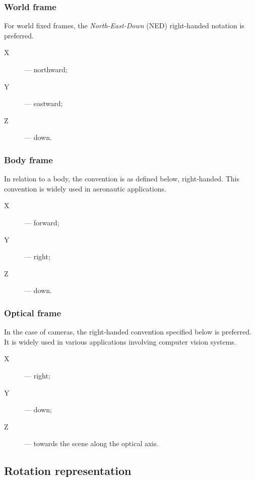\subsubsection{World frame}

For world fixed frames, the \emph{North-East-Down} (NED) right-handed notation is preferred.
\begin{samepage}
\begin{description}
    \item[X] --- northward;
    \item[Y] --- eastward;
    \item[Z] --- down.
\end{description}
\end{samepage}

\subsubsection{Body frame}

In relation to a body, the convention is as defined below, right-handed.
This convention is widely used in aeronautic applications.
\begin{samepage}
\begin{description}
    \item[X] --- forward;
    \item[Y] --- right;
    \item[Z] --- down.
\end{description}
\end{samepage}

\subsubsection{Optical frame}

In the case of cameras, the right-handed convention specified below is preferred.
It is widely used in various applications involving computer vision systems.
\begin{samepage}
\begin{description}
    \item[X] --- right;
    \item[Y] --- down;
    \item[Z] --- towards the scene along the optical axis.
\end{description}
\end{samepage}

\subsection{Rotation representation}

